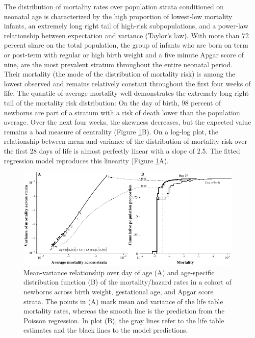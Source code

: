 \documentclass[10pt,twoside,reqno]{article}
\makeatletter
\def\cnstmaxfigwidth{
      \ifdim \Gin@nat@width>\linewidth
        \linewidth
      \else \Gin@nat@width
      \fi
    }
\let\Oldincludegraphics\includegraphics
\renewcommand{\includegraphics}[1]{\Oldincludegraphics[width=\cnstmaxfigwidth]{#1}}
\makeatother
\begin{document}
The distribution of mortality rates over population strata conditioned on neonatal age is characterized by the high proportion of lowest-low mortality infants, an extremely long right tail of high-risk subpopulations, and a power-law relationship between expectation and variance (Taylor's law). With more than 72 percent share on the total population, the group of infants who are born on term or post-term with regular or high birth weight and a five minute Apgar score of nine, are the most prevalent stratum throughout the entire neonatal period. Their mortality (the mode of the distribution of mortality risk) is among the lowest observed and remains relatively constant throughout the first four weeks of life. The quantile of average mortality well demonstrates the extremely long right tail of the mortality risk distribution: On the day of birth, 98 percent of newborns are part of a stratum with a risk of death lower than the population average. Over the next four weeks, the skewness decreases, but the expected value remains a bad measure of centrality (Figure \ref{fig:distribution-of-risk}B). On a log-log plot, the relationship between mean and variance of the distribution of mortality risk over the first 28 days of life is almost perfectly linear with a slope of 2.5. The fitted regression model reproduces this linearity (Figure \ref{fig:distribution-of-risk}A).

\begin{figure}
\centering
\includegraphics{fig/distribution_of_risk.pdf}
\caption{\label{fig:distribution-of-risk}Mean-variance relationship over day of age (A) and age-specific distribution function (B) of the mortality/hazard rates in a cohort of newborns across birth weight, gestational age, and Apgar score strata. The points in (A) mark mean and variance of the life table mortality rates, whereas the smooth line is the prediction from the Poisson regression. In plot (B), the gray lines refer to the life table estimates and the black lines to the model predictions.}
\end{figure}
\end{document}
